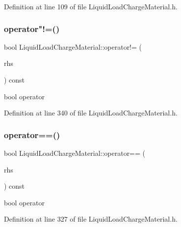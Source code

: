 Definition at line 109 of file Liquid\+Load\+Charge\+Material.\+h.

\mbox{\label{class_liquid_load_charge_material_aa6ad825ee8ab1c7816ce3bf10260c0bb}} 
\subsubsection{\texorpdfstring{operator"!=()}{operator!=()}}
{\footnotesize\ttfamily bool Liquid\+Load\+Charge\+Material\+::operator!= (\begin{DoxyParamCaption}\item[{const \hyperlink{class_liquid_load_charge_material}{Liquid\+Load\+Charge\+Material} \&}]{rhs }\end{DoxyParamCaption}) const\hspace{0.3cm}{\ttfamily [inline]}}

bool operator 

Definition at line 340 of file Liquid\+Load\+Charge\+Material.\+h.

\mbox{\label{class_liquid_load_charge_material_ad2090d1628f26e46339e9e164b47d3a2}} 
\subsubsection{\texorpdfstring{operator==()}{operator==()}}
{\footnotesize\ttfamily bool Liquid\+Load\+Charge\+Material\+::operator== (\begin{DoxyParamCaption}\item[{const \hyperlink{class_liquid_load_charge_material}{Liquid\+Load\+Charge\+Material} \&}]{rhs }\end{DoxyParamCaption}) const\hspace{0.3cm}{\ttfamily [inline]}}

bool operator 

Definition at line 327 of file Liquid\+Load\+Charge\+Material.\+h.

\mbox{\label{class_liquid_load_charge_material_a557c1f588cfb972ff0c7f748d6c2bd8f}} 

